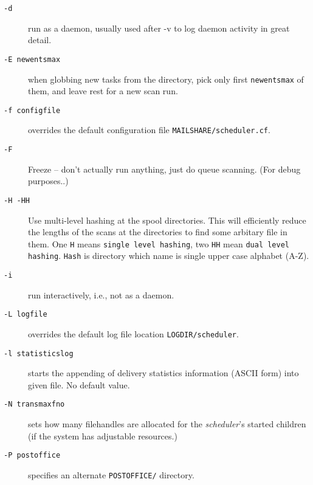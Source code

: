 \begin{description}
\item[{\tt -d}] \mbox{}

run as a daemon, usually used after -v to log daemon activity 
in great detail.

\item[{\tt -E newentsmax}] \mbox{}

when globbing new tasks from the directory, pick 
only first {\tt newentsmax} of them, and leave rest for a new scan run.

\item[{\tt -f configfile}] \mbox{}

overrides the default configuration file 
{\tt MAILSHARE/scheduler.cf}.

\item[{\tt -F}] \mbox{}

Freeze -- don't actually run anything, just do queue scanning.
(For debug purposes..)

\item[{\tt -H -HH}] \mbox{}

Use multi-level hashing at the spool directories.
This will efficiently reduce the lengths of the scans at the directories
to find some arbitary file in them.
One {\tt H} means {\tt single level hashing}, two {\tt HH} mean
{\tt dual level hashing}. {\tt Hash} is directory which name is
single upper case alphabet (A-Z).

\item[{\tt -i}] \mbox{}

run interactively, i.e., not as a daemon.

\item[{\tt -L logfile}] \mbox{}

overrides the default log file location 
{\tt LOGDIR/scheduler}.

\item[{\tt -l statisticslog}] \mbox{}

starts the appending of delivery statistics 
information (ASCII form) into given file.  No default value.

\item[{\tt -N transmaxfno}] \mbox{}

sets how many filehandles are allocated for the 
{\em scheduler\/}'s started children (if the system has adjustable resources.)

\item[{\tt -P postoffice}] \mbox{}

specifies an alternate {\tt POSTOFFICE/} directory.


\end{description}
